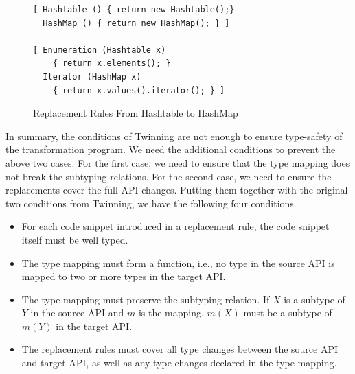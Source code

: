 \begin{figure}
\begin{lstlisting}
[ Hashtable () { return new Hashtable();}
  HashMap () { return new HashMap(); } ]

[ Enumeration (Hashtable x) 
    { return x.elements(); }
  Iterator (HashMap x) 
    { return x.values().iterator(); } ]
\end{lstlisting}
\caption{Replacement Rules From Hashtable to HashMap}
\label{fig:table2map}
\end{figure}



In summary, the conditions of Twinning are not
enough to ensure type-safety of the transformation program. We need
the additional conditions to prevent the above two cases. For the first
case, we need to ensure that  the type mapping does not break the
subtyping relations. For the second case, we need to ensure the
replacements cover the full API changes. Putting them together with
the original two conditions from Twinning, we
have the following four conditions.
\begin{itemize}
\item For each code snippet introduced in a replacement rule, the code
  snippet itself must be well typed.
\item The type mapping must form a function, i.e., no type in the
  source API is mapped to two or more types in the target API.
\item The type mapping must preserve the subtyping relation. If $X$ is
  a subtype of $Y$ in the source API and $m$ is the mapping, $m(X)$
  must be a subtype of $m(Y)$ in the target API.
\item %
  The replacement rules must cover all type changes between the source
  API and target API, 
  as well as any type changes declared in the type mapping.
\end{itemize}

